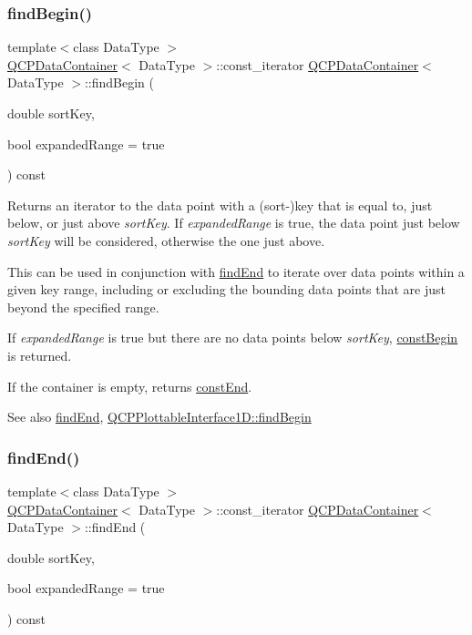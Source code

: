 \subsubsection{\texorpdfstring{find\+Begin()}{findBegin()}}
{\footnotesize\ttfamily template$<$class Data\+Type $>$ \\
\hyperlink{classQCPDataContainer}{Q\+C\+P\+Data\+Container}$<$ Data\+Type $>$\+::const\+\_\+iterator \hyperlink{classQCPDataContainer}{Q\+C\+P\+Data\+Container}$<$ Data\+Type $>$\+::find\+Begin (\begin{DoxyParamCaption}\item[{double}]{sort\+Key,  }\item[{bool}]{expanded\+Range = {\ttfamily true} }\end{DoxyParamCaption}) const}

Returns an iterator to the data point with a (sort-\/)key that is equal to, just below, or just above {\itshape sort\+Key}. If {\itshape expanded\+Range} is true, the data point just below {\itshape sort\+Key} will be considered, otherwise the one just above.

This can be used in conjunction with \hyperlink{classQCPDataContainer_afb8b8f23cc2b7234a793a25ce79fe48f}{find\+End} to iterate over data points within a given key range, including or excluding the bounding data points that are just beyond the specified range.

If {\itshape expanded\+Range} is true but there are no data points below {\itshape sort\+Key}, \hyperlink{classQCPDataContainer_a49d7622999e2de67fa2331626a3159aa}{const\+Begin} is returned.

If the container is empty, returns \hyperlink{classQCPDataContainer_aa7f7cf239b85b1a28de3d675cc5b3da1}{const\+End}.

\begin{DoxySeeAlso}{See also}
\hyperlink{classQCPDataContainer_afb8b8f23cc2b7234a793a25ce79fe48f}{find\+End}, \hyperlink{classQCPPlottableInterface1D_a5b95783271306a4de97be54eac1e7d13}{Q\+C\+P\+Plottable\+Interface1\+D\+::find\+Begin} 
\end{DoxySeeAlso}
\mbox{\label{classQCPDataContainer_afb8b8f23cc2b7234a793a25ce79fe48f}} 
\subsubsection{\texorpdfstring{find\+End()}{findEnd()}}
{\footnotesize\ttfamily template$<$class Data\+Type $>$ \\
\hyperlink{classQCPDataContainer}{Q\+C\+P\+Data\+Container}$<$ Data\+Type $>$\+::const\+\_\+iterator \hyperlink{classQCPDataContainer}{Q\+C\+P\+Data\+Container}$<$ Data\+Type $>$\+::find\+End (\begin{DoxyParamCaption}\item[{double}]{sort\+Key,  }\item[{bool}]{expanded\+Range = {\ttfamily true} }\end{DoxyParamCaption}) const}

